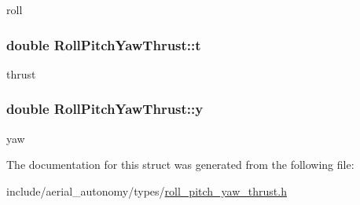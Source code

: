 roll 

\hypertarget{structRollPitchYawThrust_aa489ea694a9abb4b891e371d31e63ec4}{
\subsubsection[{t}]{\setlength{\rightskip}{0pt plus 5cm}double Roll\-Pitch\-Yaw\-Thrust\-::t}}\label{structRollPitchYawThrust_aa489ea694a9abb4b891e371d31e63ec4}


thrust 

\hypertarget{structRollPitchYawThrust_a0c2bb32fd791f081b55ffd971dcf1206}{
\subsubsection[{y}]{\setlength{\rightskip}{0pt plus 5cm}double Roll\-Pitch\-Yaw\-Thrust\-::y}}\label{structRollPitchYawThrust_a0c2bb32fd791f081b55ffd971dcf1206}


yaw 



The documentation for this struct was generated from the following file\-:\begin{DoxyCompactItemize}
\item 
include/aerial\-\_\-autonomy/types/\hyperlink{roll__pitch__yaw__thrust_8h}{roll\-\_\-pitch\-\_\-yaw\-\_\-thrust.\-h}\end{DoxyCompactItemize}
